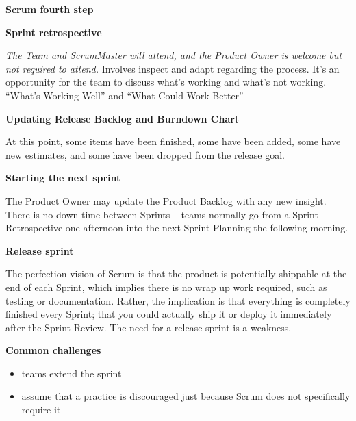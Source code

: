 \documentclass{article}
\begin{document}
\begin{flushleft}
    \bigskip

    \textbf{\large Scrum fourth step}\par
    \textbf{Sprint retrospective}\par
    \emph{The Team and ScrumMaster will attend, and the Product Owner is welcome
    but not required to attend.} Involves inspect and adapt regarding the process. It’s an opportunity for the team to discuss what’s working and what’s not working. 
    “What’s Working Well” and “What Could Work Better”

    \bigskip
    \textbf{Updating Release Backlog and Burndown Chart}\par
    At this point, some items have been finished, some have been added, some have new estimates, and some have been dropped from the release goal. 

    \bigskip
    \textbf{Starting the next sprint}\par
    The Product Owner may update the Product Backlog with any new insight. There is no down time between Sprints – teams normally go from a Sprint Retrospective
    one afternoon into the next Sprint Planning the following morning.

    \bigskip
    \textbf{Release sprint}\par
    The perfection vision of Scrum is that the product is potentially shippable at the end of each
Sprint, which implies there is no wrap up work required, such as testing or documentation.
Rather, the implication is that everything is completely finished every Sprint; that you could
actually ship it or deploy it immediately after the Sprint Review. The need for a release sprint is a weakness. 

    \bigskip
    \textbf{Common challenges}\par
    \begin{itemize}
        \item teams extend the sprint
        \item assume that a practice is discouraged just because Scrum does not specifically require it
    \end{itemize}



\end{flushleft}    
\end{document}
